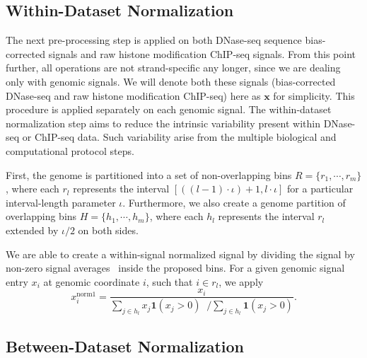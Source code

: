 \subsection{Within-Dataset Normalization}
\label{sec:withindataset.normalization}

The next pre-processing step is applied on both DNase-seq sequence bias-corrected signals and raw histone modification ChIP-seq signals. From this point further, all operations are not strand-specific any longer, since we are dealing only with genomic signals. We will denote both these signals (bias-corrected DNase-seq and raw histone modification ChIP-seq) here as $\mathbf{x}$ for simplicity. This procedure is applied separately on each genomic signal. The within-dataset normalization step aims to reduce the intrinsic variability present within DNase-seq or ChIP-seq data. Such variability arise from the multiple biological and computational protocol steps.

First, the genome is partitioned into a set of non-overlapping bins ${R} = \{ {r}_{1}, \cdots, {r}_{m} \}$, where each ${r}_{l}$ represents the interval $[((l-1) \cdot \iota )+1, l \cdot \iota]$ for a particular interval-length parameter $\iota$. Furthermore, we also create a genome partition of overlapping bins ${H} = \{ {h}_{1}, \cdots, {h}_{m} \}$, where each ${h}_{l}$ represents the interval ${r}_{l}$ extended by $\iota/2$ on both sides.

We are able to create a within-signal normalized signal by dividing the signal by non-zero signal averages~\cite{boyle2011} inside the proposed bins. For a given genomic signal entry $x_i$ at genomic coordinate $i$, such that $i \in {r}_{l}$, we apply
\begin{equation}
  \label{eq:signal.within.norm}
  {x}^{\text{norm1}}_{i} = \frac{{x}_{i}}{ 
                     \sum\limits_{j \in {h}_{l}} {x}_{j} \mathbf{1}({x}_{j} > 0)  \;\; \Big/  
                     \sum\limits_{j \in {h}_{l}} \mathbf{1}({x}_{j} > 0)
                     }.
\end{equation}

\subsection{Between-Dataset Normalization}
\label{sec:betweendataset.normalization}


